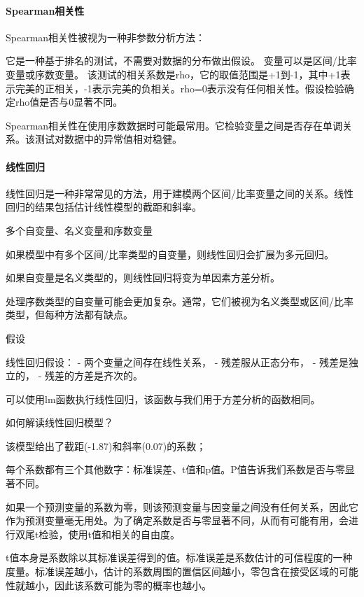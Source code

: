 \documentclass[]{book}
\let\oldparagraph\paragraph
\renewcommand{\paragraph}[1]{\oldparagraph{#1}\mbox{}}
\begin{document}
\hypertarget{spearmanux76f8ux5173ux6027}{%
\paragraph{Spearman相关性}\label{spearmanux76f8ux5173ux6027}}

Spearman相关性被视为一种非参数分析方法：

它是一种基于排名的测试，不需要对数据的分布做出假设。
变量可以是区间/比率变量或序数变量。
该测试的相关系数是rho，它的取值范围是+1到-1，其中+1表示完美的正相关，-1表示完美的负相关。rho=0表示没有任何相关性。假设检验确定rho值是否与0显著不同。

Spearman相关性在使用序数数据时可能最常用。它检验变量之间是否存在单调关系。该测试对数据中的异常值相对稳健。

\hypertarget{ux7ebfux6027ux56deux5f52}{%
\paragraph{线性回归}\label{ux7ebfux6027ux56deux5f52}}

线性回归是一种非常常见的方法，用于建模两个区间/比率变量之间的关系。线性回归的结果包括估计线性模型的截距和斜率。

多个自变量、名义变量和序数变量

如果模型中有多个区间/比率类型的自变量，则线性回归会扩展为多元回归。

如果自变量是名义类型的，则线性回归将变为单因素方差分析。

处理序数类型的自变量可能会更加复杂。通常，它们被视为名义类型或区间/比率类型，但每种方法都有缺点。

假设

线性回归假设：
- 两个变量之间存在线性关系，
- 残差服从正态分布，
- 残差是独立的，
- 残差的方差是齐次的。

可以使用lm函数执行线性回归，该函数与我们用于方差分析的函数相同。

如何解读线性回归模型？

该模型给出了截距(-1.87)和斜率(0.07)的系数；

每个系数都有三个其他数字：标准误差、t值和p值。P值告诉我们系数是否与零显著不同。

如果一个预测变量的系数为零，则该预测变量与因变量之间没有任何关系，因此它作为预测变量毫无用处。为了确定系数是否与零显著不同，从而有可能有用，会进行双尾t检验，使用t值和相关的自由度。

t值本身是系数除以其标准误差得到的值。标准误差是系数估计的可信程度的一种度量。标准误差越小，估计的系数周围的置信区间越小，零包含在接受区域的可能性就越小，因此该系数可能为零的概率也越小。
\end{document}
